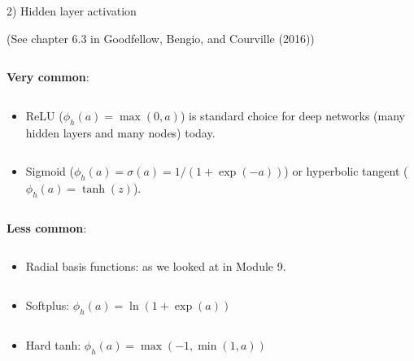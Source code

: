 \documentclass[10pt,ignorenonframetext,]{beamer}
\providecommand{\tightlist}{%
  \setlength{\itemsep}{0pt}\setlength{\parskip}{0pt}}
\begin{document}
\begin{frame}

\begin{block}{2) Hidden layer activation}

\tiny

(See chapter 6.3 in Goodfellow, Bengio, and Courville (2016))

\normalsize

\(~\)

\textbf{Very common}:

\(~\)

\begin{itemize}
\tightlist
\item
  ReLU (\(\phi_h(a)=\max(0,a)\)) is standard choice for deep networks
  (many hidden layers and many nodes) today.
\end{itemize}

\(~\)

\begin{itemize}
\tightlist
\item
  Sigmoid (\(\phi_h(a)=\sigma(a)=1/(1+\exp(-a))\)) or hyperbolic tangent
  (\(\phi_h(a)=\tanh(z)\)).
\end{itemize}

\(~\)

\textbf{Less common}:

\(~\)

\begin{itemize}
\tightlist
\item
  Radial basis functions: as we looked at in Module 9.
\end{itemize}

\(~\)

\begin{itemize}
\tightlist
\item
  Softplus: \(\phi_h(a)=\ln(1+\exp(a))\)
\end{itemize}

\(~\)

\begin{itemize}
\tightlist
\item
  Hard tanh: \(\phi_h(a)=\max(-1,\min(1,a))\)
\end{itemize}

\end{block}

\end{frame}
\end{document}
